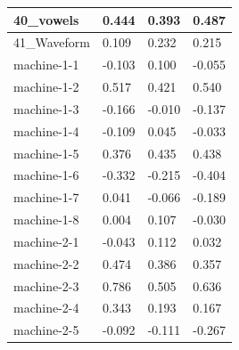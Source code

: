 \begin{table}[]
{\begin{tabular}{|l|l|l|l|}
		40\_vowels      & 0.444                                  & 0.393                                 & 0.487                         \\ \hline
		41\_Waveform    & 0.109                                  & 0.232                                 & 0.215                         \\ \hline
		machine-1-1     & -0.103                                 & 0.100                                 & -0.055                        \\ \hline
		machine-1-2     & 0.517                                  & 0.421                                 & 0.540                         \\ \hline
		machine-1-3     & -0.166                                 & -0.010                                & -0.137                        \\ \hline
		machine-1-4     & -0.109                                 & 0.045                                 & -0.033                        \\ \hline
		machine-1-5     & 0.376                                  & 0.435                                 & 0.438                         \\ \hline
		machine-1-6     & -0.332                                 & -0.215                                & -0.404                        \\ \hline
		machine-1-7     & 0.041                                  & -0.066                                & -0.189                        \\ \hline
		machine-1-8     & 0.004                                  & 0.107                                 & -0.030                        \\ \hline
		machine-2-1     & -0.043                                 & 0.112                                 & 0.032                         \\ \hline
		machine-2-2     & 0.474                                  & 0.386                                 & 0.357                         \\ \hline
		machine-2-3     & 0.786                                  & 0.505                                 & 0.636                         \\ \hline
		machine-2-4     & 0.343                                  & 0.193                                 & 0.167                         \\ \hline
		machine-2-5     & -0.092                                 & -0.111                                & -0.267                        \\ \hline

\end{tabular}}
\end{table}
